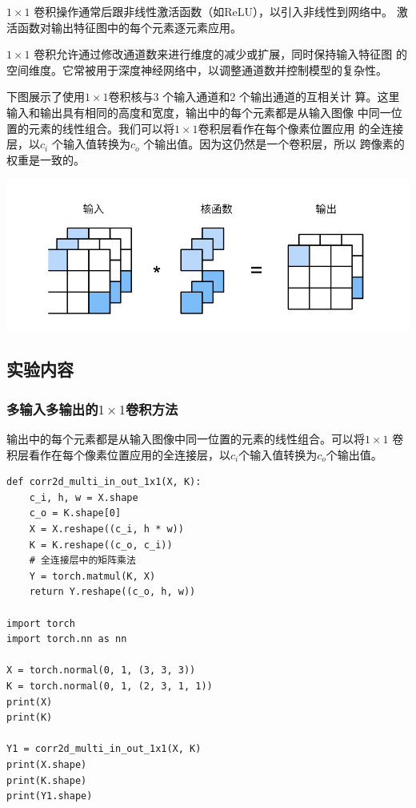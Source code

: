 \documentclass[a4paper,12pt]{article}
\begin{document}
$1 \times 1$ 卷积操作通常后跟非线性激活函数（如ReLU），以引入非线性到网络中。
激活函数对输出特征图中的每个元素逐元素应用。

$1 \times 1$ 卷积允许通过修改通道数来进行维度的减少或扩展，同时保持输入特征图
的空间维度。它常被用于深度神经网络中，以调整通道数并控制模型的复杂性。

下图展示了使用$1 \times 1$卷积核与3 个输入通道和2 个输出通道的互相关计
算。这里输入和输出具有相同的高度和宽度，输出中的每个元素都是从输入图像
中同一位置的元素的线性组合。我们可以将$1 \times 1$卷积层看作在每个像素位置应用
的全连接层，以$c_i$ 个输入值转换为$c_o$ 个输出值。因为这仍然是一个卷积层，所以
跨像素的权重是一致的。

\centering %
\includegraphics[width=0.8\linewidth]{images/1x1.png}

\justifying
\subsection{实验内容}
\subsubsection{多输入多输出的$1 \times 1$卷积方法}
输出中的每个元素都是从输入图像中同一位置的元素的线性组合。可以将$1×1$
卷积层看作在每个像素位置应用的全连接层，以$c_i $个输入值转换为$c_o $个输出值。
\begin{lstlisting}
def corr2d_multi_in_out_1x1(X, K):
    c_i, h, w = X.shape
    c_o = K.shape[0]
    X = X.reshape((c_i, h * w))
    K = K.reshape((c_o, c_i))
    # 全连接层中的矩阵乘法
    Y = torch.matmul(K, X)
    return Y.reshape((c_o, h, w))

import torch
import torch.nn as nn

X = torch.normal(0, 1, (3, 3, 3))
K = torch.normal(0, 1, (2, 3, 1, 1))
print(X)
print(K)

Y1 = corr2d_multi_in_out_1x1(X, K)
print(X.shape)
print(K.shape)
print(Y1.shape)

\end{lstlisting}
\end{document}
